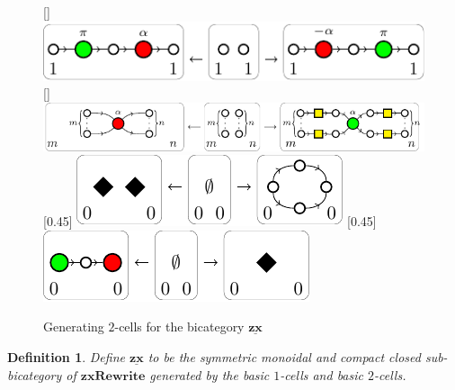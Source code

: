 \documentclass[]{amsart}
\theoremstyle{defn}
\newtheorem{defn}[thm]{Definition}
\begin{document}
\begin{figure}[h]
{\begin{minipage}{\textwidth}
{			}
			\linebreak
			[\textwidth]{%
				\includegraphics[scale=0.75]{2cell_pi_commutation}
			}
			\linebreak
			[\textwidth]{%
				\includegraphics[scale=0.75]{2cell_color_change}
			}
			\linebreak
			[0.45\textwidth]{%
				\includegraphics[scale=0.75]{2cell_loop}
			}
			[0.45\textwidth]{%
				\includegraphics[scale=0.75]{2cell_diamond}
			}
		\end{minipage}
	}
	\caption{Generating $2$-cells for the bicategory $\underline{\mathbf{zx}}$}
	\label{fig:ZX 2cells generators}
\end{figure}

\begin{defn}
	\label{def:zx bicat}
	Define $\underline{\mathbf{zx}}$ to be the symmetric monoidal and compact closed sub-bicategory of $\mathbf{zxRewrite}$ generated by the basic $1$-cells and basic $2$-cells.
\end{defn}
\end{document}

